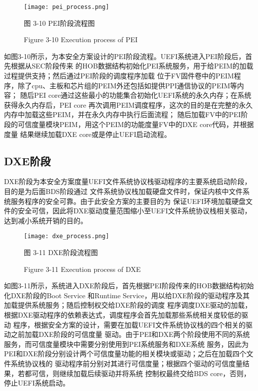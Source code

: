 \begin{figure}[htb]
    \label{ffs_format}
    \vspace{0cm}   
    \setlength{\abovecaptionskip}{0.3cm}
	\centering
    \texttt{[image: pei\_process.png]}
    \caption*{图 3-10 PEI阶段流程图}
    \setlength{\belowcaptionskip}{-0.7cm}
    \caption*{Figure 3-10 Execution process of PEI}
\end{figure}

如图3-10所示，为本安全方案设计的PEI阶段流程。UEFI系统进入PEI阶段后，首先根据从SEC阶段传来
的HOB数据结构初始化PEI系统服务，用于给PEIM的加载过程提供支持；然后通过PEI阶段的调度程序加载
位于FV固件卷中的PEIM程序，除了cpu、主板和芯片组的PEIM外还包括如提供PPI通信协议的PEIM等内容；
随后PEI core通过这些最小的功能集合初始化UEFI系统的永久内存；在系统获得永久内存后，PEI core
再次调用PEIM调度程序，这次的目的是在完整的永久内存中加载这些PEIM，并在永久内存中执行后面流程；
随后加载FV中的PEI阶段的可信度量模块PEIM，用这个PEIM的功能度量FV中的DXE core代码，并根据度量
结果继续加载DXE core或是停止UEFI启动流程。

\subsection{DXE阶段}
DXE阶段为本安全方案度量UEFI文件系统协议栈驱动程序的主要系统启动阶段，目的是为后面BDS阶段通过
文件系统协议栈加载硬盘文件时，保证内核中文件系统服务程序的安全可靠。由于此安全方案的主要目的为
保证UEFI环境加载硬盘文件的安全可信，因此将DXE驱动度量范围缩小至UEFI文件系统协议栈相关驱动，
达到减小系统开销的目的。

\begin{figure}[htb]
    \label{ffs_format}
    \vspace{0cm}   
    \setlength{\abovecaptionskip}{0.3cm}
	\centering
    \texttt{[image: dxe\_process.png]}
    \caption*{图 3-11 DXE阶段流程图}
    \setlength{\belowcaptionskip}{-0.7cm}
    \caption*{Figure 3-11 Execution process of DXE}
\end{figure}

如图3-11所示，系统进入DXE阶段后，首先根据PEI阶段传来的HOB数据结构初始化DXE阶段的Boot Service
和Runtime Service，用以给DXE阶段的驱动程序及其加载提供系统服务；随后控制权交给DXE阶段的调度
程序调度DXE驱动的加载，根据DXE驱动程序的依赖表达式，调度程序会首先加载那些系统相关度较低的驱动
程序，根据安全方案的设计，需要在加载UEFI文件系统协议栈的四个相关的驱动之前加载DXE阶段的可信度量
驱动。由于PEI和DXE两个阶段使用不同的系统服务，而可信度量模块中需要分别使用到PEI系统服务和DXE系统
服务，因此为PEI和DXE阶段分别设计两个可信度量功能的相关模块或驱动；之后在加载四个文件系统协议栈的
驱动程序前分别对其进行可信度量；根据四个驱动的可信度量结果，若都可信，则继续加载后续驱动并将系统
控制权最终交给BDS core，否则，停止UEFI系统启动。

